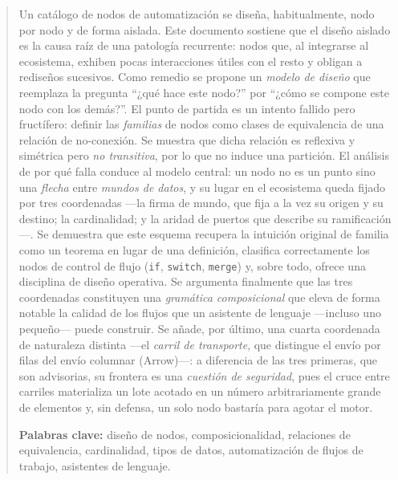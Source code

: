\documentclass[11pt,a4paper]{article}
\theoremstyle{definition}
\theoremstyle{plain}
\begin{document}
\thispagestyle{fancy}
\begin{abstract}
\noindent
Un catálogo de nodos de automatización se diseña, habitualmente, nodo por nodo y
de forma aislada. Este documento sostiene que el diseño aislado es la causa raíz
de una patología recurrente: nodos que, al integrarse al ecosistema, exhiben pocas
interacciones útiles con el resto y obligan a rediseños sucesivos. Como remedio se
propone un \emph{modelo de diseño} que reemplaza la pregunta ``¿qué hace este
nodo?'' por ``¿cómo se compone este nodo con los demás?''. El punto de partida es
un intento fallido pero fructífero: definir las \emph{familias} de nodos como
clases de equivalencia de una relación de no-conexión. Se muestra que dicha
relación es reflexiva y simétrica pero \emph{no transitiva}, por lo que no induce
una partición. El análisis de por qué falla conduce al modelo central: un nodo no
es un punto sino una \emph{flecha} entre \emph{mundos de datos}, y su lugar en el
ecosistema queda fijado por tres coordenadas ---la firma de mundo, que fija a la
vez su origen y su destino; la cardinalidad; y la aridad de puertos que describe
su ramificación---. Se demuestra que este esquema recupera la intuición original de
familia como un teorema en lugar de una definición, clasifica correctamente los
nodos de control de flujo (\texttt{if}, \texttt{switch}, \texttt{merge}) y, sobre
todo, ofrece una disciplina de diseño operativa. Se argumenta finalmente que las
tres coordenadas constituyen una \emph{gramática composicional} que eleva de forma
notable la calidad de los flujos que un asistente de lenguaje ---incluso uno
pequeño--- puede construir. Se añade, por último, una cuarta coordenada de naturaleza
distinta ---el \emph{carril de transporte}, que distingue el envío por filas del envío
columnar (Arrow)---: a diferencia de las tres primeras, que son advisorias, su
frontera es una \emph{cuestión de seguridad}, pues el cruce entre carriles materializa
un lote acotado en un número arbitrariamente grande de elementos y, sin defensa, un
solo nodo bastaría para agotar el motor.

\vspace{0.4cm}
\noindent\textbf{Palabras clave:} diseño de nodos, composicionalidad, relaciones
de equivalencia, cardinalidad, tipos de datos, automatización de flujos de trabajo,
asistentes de lenguaje.
\end{abstract}
\end{document}
